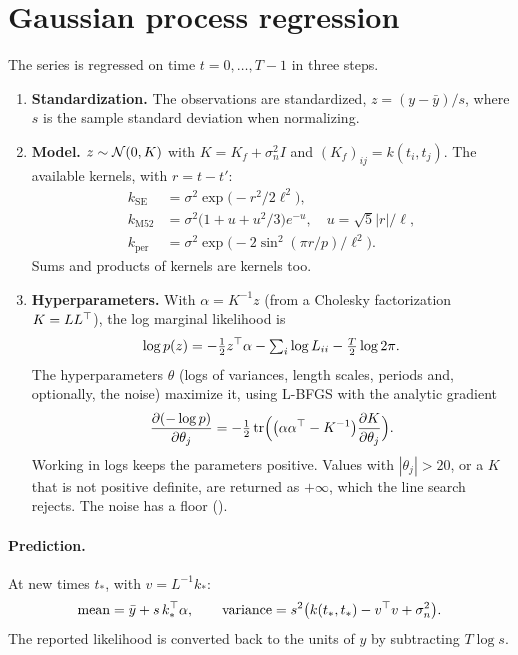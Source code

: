 \section{Gaussian process regression}
The series is regressed on time $t=0,\dots,T-1$ in three steps.
\begin{enumerate}
  \item \textbf{Standardization.} The observations are standardized,
        $z=(y-\bar y)/s$, where $s$ is the sample standard deviation when normalizing.
  \item \textbf{Model.} $z\sim\mathcal{N}(0,K)$ with $K=K_f+\sigma_n^2I$ and
        $(K_f)_{ij}=k(t_i,t_j)$. The available kernels, with $r=t-t'$:
\begin{align*}
  k_{\text{SE}}&=\sigma^2\exp\!\big(-r^2/2\ell^2\big),\\
  k_{\text{M52}}&=\sigma^2\big(1+u+u^2/3\big)e^{-u},\quad u=\sqrt5|r|/\ell,\\
  k_{\text{per}}&=\sigma^2\exp\!\big(-2\sin^2(\pi r/p)/\ell^2\big).
\end{align*}
        Sums and products of kernels are kernels too.
  \item \textbf{Hyperparameters.} With $\alpha=K^{-1}z$ (from a Cholesky factorization
        $K=LL^\top$), the log marginal likelihood is
\[
  \log p(z)=-\tfrac12z^\top\alpha-\textstyle\sum_i\log L_{ii}-\tfrac T2\log2\pi .
\]
        The hyperparameters $\theta$ (logs of variances, length scales, periods and,
        optionally, the noise) maximize it, using L-BFGS with the analytic gradient
\[
  \frac{\partial(-\log p)}{\partial\theta_j}=-\tfrac12\operatorname{tr}\!\Big(\big(\alpha\alpha^\top-K^{-1}\big)\frac{\partial K}{\partial\theta_j}\Big).
\]
        Working in logs keeps the parameters positive. Values with $|\theta_j|>20$, or a
        $K$ that is not positive definite, are returned as $+\infty$, which the line search
        rejects. The noise has a floor ().
\end{enumerate}

\paragraph{Prediction.} At new times $t_*$, with $v=L^{-1}k_*$:
\[
  \text{mean}=\bar y+s\,k_*^\top\alpha,\qquad
  \text{variance}=s^2\big(k(t_*,t_*)-v^\top v+\sigma_n^2\big).
\]
The reported likelihood is converted back to the units of $y$ by subtracting $T\log s$.
\begin{codepointers}
\end{codepointers}

